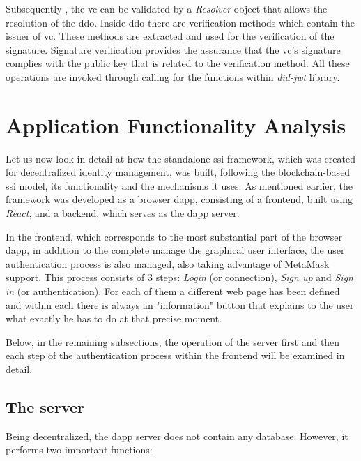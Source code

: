 Subsequently , the \gls{vc} can be validated by a \textit{Resolver} object that allows the resolution of the \gls{ddo}. Inside \gls{ddo} there are verification methods which contain 
the issuer of \gls{vc}.  These methods are extracted and used for the verification of the signature.  Signature verification provides the assurance that the \gls{vc}'s signature 
complies with the public key that is related to the verification method. All these operations are invoked through calling for the functions within \textit{did-jwt} library.

\section{Application Functionality Analysis}

Let us now look in detail at how the standalone \gls{ssi} framework, which was created for decentralized identity management, was built, following the blockchain-based \gls{ssi} model, 
its functionality and the mechanisms it uses. As mentioned earlier, the framework was developed as a browser \gls{dapp}, consisting of a frontend, built 
using \textit{React}, and a backend, which serves as the \gls{dapp} server. 

In the frontend, which corresponds to the most substantial part of the browser \gls{dapp}, in addition to the complete manage the graphical user interface, 
the user authentication process is also managed, also taking advantage of MetaMask support. This process consists of 3 steps: \textit{Login} (or connection), \textit{Sign up} and \textit{Sign in} (or
authentication). For each of them a different web page has been defined and within each there is always an "information" button that explains to the user what exactly he
has to do at that precise moment. 

Below, in the remaining subsections, the operation of the server first and then each step of the authentication process within the frontend will be examined in detail.

\subsection{The server}

Being decentralized, the \gls{dapp} server does not contain any database. However, it performs two important functions:

